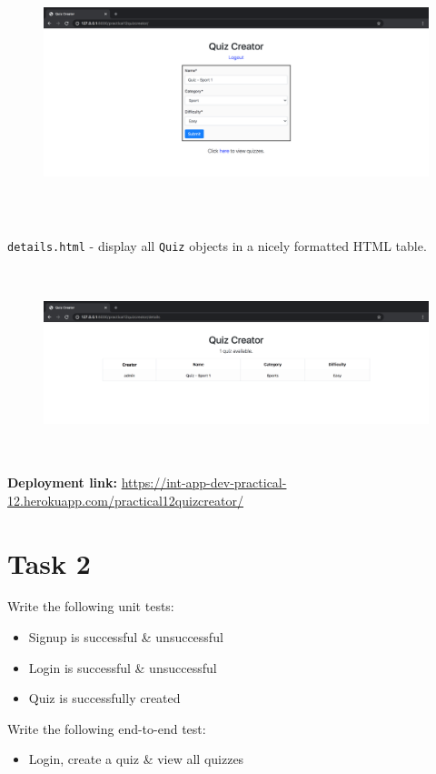 \documentclass{article}
\begin{document}
\begin{figure}[H]
  \includegraphics[width=175mm, height=75mm]{./img/12-expected-quiz-6.png}
\end{figure}

\texttt{details.html} - display all \texttt{Quiz} objects in a nicely formatted HTML table.

\begin{figure}[H]
  \includegraphics[width=175mm, height=55mm]{./img/12-expected-quiz-7.png}
\end{figure}

\textbf{Deployment link:} \href{https://int-app-dev-practical-12.herokuapp.com/practical12quizcreator/}{https://int-app-dev-practical-12.herokuapp.com/practical12quizcreator/}

\section*{Task 2} 
Write the following unit tests:
\begin{itemize}
  \item Signup is successful \& unsuccessful
  \item Login is successful \& unsuccessful
  \item Quiz is successfully created 
\end{itemize}

Write the following end-to-end test:
\begin{itemize}
  \item Login, create a quiz \& view all quizzes
\end{itemize}
\end{document}

